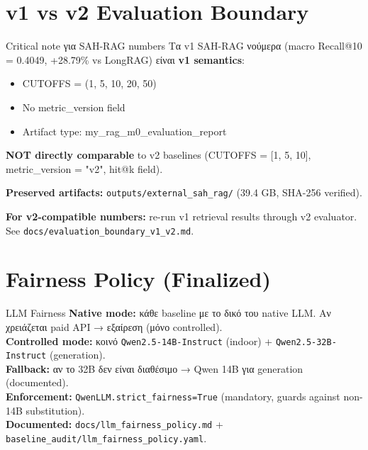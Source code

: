 \documentclass[11pt,a4paper]{article}
\begin{document}
\section{v1 vs v2 Evaluation Boundary}

\begin{warnbox}{Critical note για SAH-RAG numbers}
Τα v1 SAH-RAG νούμερα (macro Recall@10 = 0.4049, +28.79\% vs LongRAG) είναι \textbf{v1 semantics}:
\begin{itemize}[nosep]
  \item CUTOFFS = (1, 5, 10, 20, 50)
  \item No metric\_version field
  \item Artifact type: my\_rag\_m0\_evaluation\_report
\end{itemize}

\textbf{NOT directly comparable} to v2 baselines (CUTOFFS = [1, 5, 10], metric\_version = "v2", hit@k field).

\textbf{Preserved artifacts:} \texttt{outputs/external\_sah\_rag/} (39.4 GB, SHA-256 verified).

\textbf{For v2-compatible numbers:} re-run v1 retrieval results through v2 evaluator. See \texttt{docs/evaluation\_boundary\_v1\_v2.md}.
\end{warnbox}

\section{Fairness Policy (Finalized)}

\begin{okbox}{LLM Fairness}
\textbf{Native mode:} κάθε baseline με το δικό του native LLM. Αν χρειάζεται paid API → εξαίρεση (μόνο controlled). \\
\textbf{Controlled mode:} κοινό \texttt{Qwen2.5-14B-Instruct} (indoor) + \texttt{Qwen2.5-32B-Instruct} (generation). \\
\textbf{Fallback:} αν το 32B δεν είναι διαθέσιμο → Qwen 14B για generation (documented). \\
\textbf{Enforcement:} \texttt{QwenLLM.strict\_fairness=True} (mandatory, guards against non-14B substitution). \\
\textbf{Documented:} \texttt{docs/llm\_fairness\_policy.md} + \texttt{baseline\_audit/llm\_fairness\_policy.yaml}.
\end{okbox}
\end{document}
